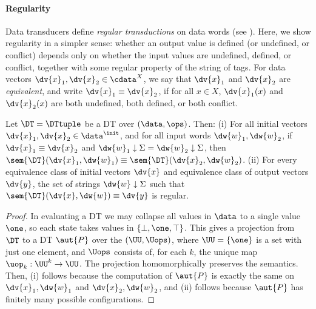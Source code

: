 \paragraph*{Regularity}
\label{dt:subsec:dt-regularity}
Data transducers define \emph{regular transductions} on data words (see ). Here, we show regularity in a simpler sense: whether an output value is defined (or undefined, or conflict) depends only on whether the input values are undefined, defined, or conflict, together with some regular property of the string of tags. For data vectors $\dv{x}_1, \dv{x}_2 \in {\cdata}^X$, we say that $\dv{x}_1$ and $\dv{x}_2$ are \emph{equivalent}, and write $\dv{x}_1 \equiv \dv{x}_2$, if for all $x \in X$, $\dv{x}_1(x)$ and $\dv{x}_2(x)$ are both undefined, both defined, or both conflict.

\begin{theorem}
\label{dt:thm:regular-language}
Let $\DT = \DTtuple$ be a DT over $(\data, \ops)$. Then:
(i) For all initial vectors $\dv{x}_1, \dv{x}_2 \in \data^\init$,
and for all input words $\dw{w}_1, \dw{w}_2$,
if $\dv{x}_1 \equiv \dv{x}_2$ and $\dw{w}_1 \downarrow \Sigma = \dw{w}_2 \downarrow \Sigma$,
then $\sem{\DT}(\dv{x}_1,\dw{w}_1) \equiv \sem{\DT}(\dv{x}_2,\dw{w}_2)$.
(ii) For every equivalence class of initial vectors $\dv{x}$ and equivalence class of output vectors $\dv{y}$, the set of strings $\dw{w} \downarrow \Sigma$ such that $\sem{\DT}(\dv{x},\dw{w}) \equiv \dv{y}$ is regular.
\end{theorem}
\begin{proof}
In evaluating a DT we may collapse all values in $\data$ to a single
value $\one$, so each state takes values in $\{\bot, \one, \top\}$.
This gives a projection from $\DT$ to a DT
$\aut{P}$ over the  $(\UU, \Uops)$,
where $\UU = \{\one\}$ is a set with just one element,
and $\Uops$ consists of, for each $k$, the unique
map $\uop_k : \UU^k \to \UU$.
The projection homomorphically preserves the semantics.
Then, (i) follows because the computation of $\aut{P}$ is exactly the same
on $\dv{x}_1, \dw{w}_1$ and $\dv{x}_2, \dw{w}_2$, and (ii) follows because $\aut{P}$ has finitely many possible configurations.
\end{proof}

